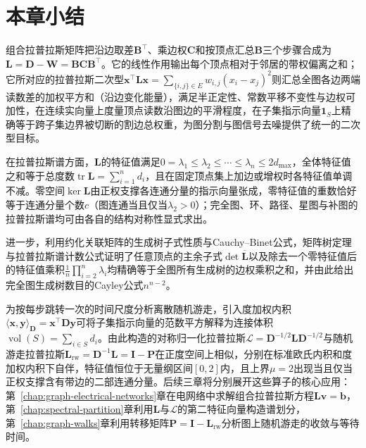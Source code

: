 \section{本章小结}
\label{sec:graph-laplacian-summary}

组合拉普拉斯矩阵把沿边取差$\bm B^\top$、乘边权$\bm C$和按顶点汇总$\bm B$三个步骤合成为$\bm L=\bm D-\bm W=\bm B\bm C\bm B^\top$。它的线性作用输出每个顶点相对于邻居的带权偏离之和；它所对应的拉普拉斯二次型$\bm x^\top\bm L\bm x=\sum_{\{i,j\}\in E}w_{i,j}(x_i-x_j)^2$则汇总全图各边两端读数差的加权平方和（沿边变化能量），满足半正定性、常数平移不变性与边权可加性，在连续实向量上度量顶点读数沿图边的平滑程度，在子集指示向量$\bm 1_S$上精确等于跨子集边界被切断的割边总权重，为图分割与图信号去噪提供了统一的二次型目标。

在拉普拉斯谱方面，$\bm L$的特征值满足$0=\lambda_1\leq\lambda_2\leq\cdots\leq\lambda_n\leq 2d_{\max}$，全体特征值之和等于总度数$\operatorname{tr}\bm L=\sum_{i=1}^n d_i$，且在固定顶点集上加边或增权时各特征值单调不减。零空间$\ker\bm L$由正权支撑各连通分量的指示向量张成，零特征值的重数恰好等于连通分量个数$c$（图连通当且仅当$\lambda_2>0$）；完全图、环、路径、星图与补图的拉普拉斯谱均可由各自的结构对称性显式求出。

进一步，利用约化关联矩阵的生成树子式性质与Cauchy--Binet公式，矩阵树定理与拉普拉斯谱计数公式证明了任意顶点的主余子式$\det\overline{\bm L}$以及除去一个零特征值后的特征值乘积$\frac1n\prod_{i=2}^n\lambda_i$均精确等于全图所有生成树的边权乘积之和，并由此给出完全图生成树数目的Cayley公式$n^{n-2}$。

为按每步跳转一次的时间尺度分析离散随机游走，引入度加权内积$\langle\bm x,\bm y\rangle_{\bm D}=\bm x^\top\bm D\bm y$可将子集指示向量的范数平方解释为连接体积$\operatorname{vol}(S)=\sum_{i\in S}d_i$。由此构造的对称归一化拉普拉斯$\mathcal L=\bm D^{-1/2}\bm L\bm D^{-1/2}$与随机游走拉普拉斯$\bm L_{\mathrm{rw}}=\bm D^{-1}\bm L=\bm I-\bm P$在正度空间上相似，分别在标准欧氏内积和度加权内积下自伴，特征值恒位于无量纲区间$[0,2]$内，且上界$\mu=2$出现当且仅当正权支撑含有带边的二部连通分量。后续三章将分别展开这些算子的核心应用：第~\ref{chap:graph-electrical-networks}章在电网络中求解组合拉普拉斯方程$\bm L\bm v=\bm b$，第~\ref{chap:spectral-partition}章利用$\bm L$与$\mathcal L$的第二特征向量构造谱划分，第~\ref{chap:graph-walks}章利用转移矩阵$\bm P=\bm I-\bm L_{\mathrm{rw}}$分析图上随机游走的收敛与等待时间。

